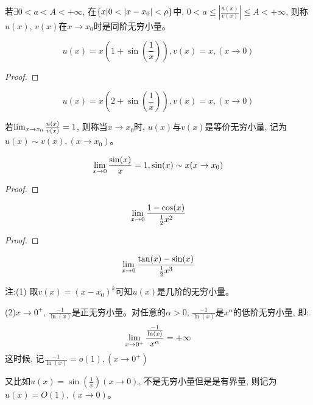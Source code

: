 \begin{definition}
    若$\exists 0 < a < A < +\infty$, 在$\left\{ x|  0 < \left| x - x_0\right| < \rho\right\}$中, $0 < a \le \left| \frac{u(x)}{v(x)} \right| \le A < +\infty$, 则称$u(x)$, $v(x)$在$x \to x_0$时是同阶无穷小量。
\end{definition}

\begin{proposition}
    \[ u(x) = x(1+\sin\left( \frac{1}{x} \right)), v(x) = x, (x \to 0) \]
\end{proposition}
\begin{proof}
    
\end{proof}

\begin{proposition}
    \[ u(x) = x(2+\sin\left( \frac{1}{x} \right)), v(x) = x, (x \to 0) \]
\end{proposition}

\begin{definition}
    若$\lim_{x \to x_0 } \frac{u(x)}{v(x)} = 1$, 则称当$x \to x_0$时, $u(x)$与$v(x)$是等价无穷小量, 记为$u(x)\sim v(x), (x \to x_0)$。
\end{definition}
\begin{proposition}
    \[ \lim_{x \to 0 } \frac{\sin(x)}{x} = 1, \sin(x) \sim x(x \to x_0)\]
\end{proposition}
\begin{proof}
    
\end{proof}
\begin{proposition}
    \[ \lim_{x \to 0 } \frac{1- \cos(x)}{\frac{1}{2}x^2} \]
\end{proposition}
\begin{proof}
    
\end{proof}
\begin{proposition}
    \[ \lim_{x \to 0 } \frac{\tan(x) - \sin(x)}{\frac{1}{2}x^3} \]    
\end{proposition}

注:(1) 取$v(x) = (x - x_0)^k$可知$u(x)$是几阶的无穷小量。

(2)$x \to 0^+$, $\frac{-1}{\ln (x)}$是正无穷小量。对任意的$\alpha > 0$, $\frac{-1}{\ln (x)}$是$x^\alpha$的低阶无穷小量, 即:
\[ \lim_{x \to 0^+ } \frac{\frac{-1}{\ln (x)}}{x^\alpha} = +\infty\]
这时候, 记$\frac{-1}{\ln (x)} = o(1), (x \to 0^+)$

又比如$u(x) = \sin\left( \frac{1}{x}\right)(x \to 0)$, 不是无穷小量但是是有界量, 则记为$u(x) = O(1), (x \to 0)$。

